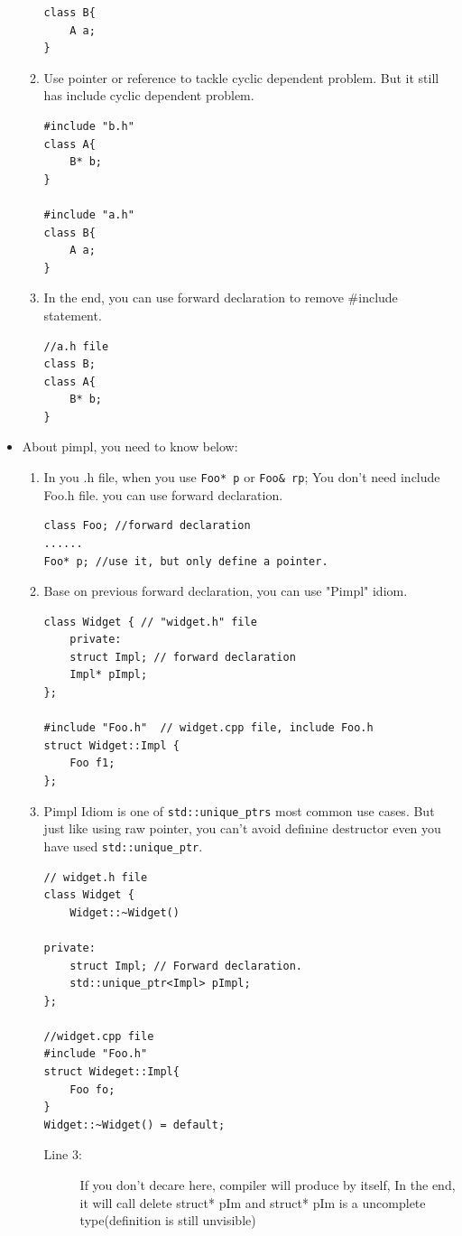 \documentclass[a4paper,11pt,twoside]{book}
\begin{document}
\begin{itemize}
\begin{enumerate}
\begin{lstlisting}[numbers=none]
class B{
	A a;
}
\end{lstlisting}
		\item Use pointer or reference to tackle cyclic dependent problem. But it still has include cyclic dependent problem. 
\begin{lstlisting}[numbers=none]
#include "b.h"
class A{
	B* b;
}
		
#include "a.h"
class B{
	A a;
}
\end{lstlisting}
		\item In the end, you can use forward declaration to remove \#include statement. 
\begin{lstlisting}[numbers=none]
//a.h file 
class B; 
class A{
	B* b;
}
\end{lstlisting}
	\end{enumerate}
	
	\item About pimpl, you need to know below:
	\begin{enumerate}
		\item In you .h file, when you use \texttt{Foo* p} or \texttt{Foo\& rp}; You don't need include Foo.h file. you can use forward declaration.
\begin{lstlisting}[numbers=none]
class Foo; //forward declaration
......
Foo* p; //use it, but only define a pointer.
\end{lstlisting}
		
		\item Base on previous forward declaration, you can use "Pimpl" idiom.
\begin{lstlisting}[numbers=none]
class Widget { // "widget.h" file
	private:
	struct Impl; // forward declaration
	Impl* pImpl;
};
		
#include "Foo.h"  // widget.cpp file, include Foo.h
struct Widget::Impl {
	Foo f1;
};
\end{lstlisting}
		
		\item Pimpl Idiom is one of \texttt{std::unique\_ptrs} most common use cases. But just like using raw pointer,  you can't avoid definine destructor even you have used \texttt{std::unique\_ptr}. 
		
\begin{lstlisting}
// widget.h file
class Widget { 
	Widget::~Widget()
	
private:
	struct Impl; // Forward declaration.
	std::unique_ptr<Impl> pImpl;
};
		
//widget.cpp file
#include "Foo.h" 
struct Wideget::Impl{
	Foo fo; 
}
Widget::~Widget() = default; 
\end{lstlisting}
\begin{description}
	\item[Line 3:] If you don't decare here, compiler will produce by itself, In the end, it will call delete struct* pIm and struct* pIm is a uncomplete type(definition is still unvisible)
	

\end{description}
\end{enumerate}
\end{itemize}
\end{document}
